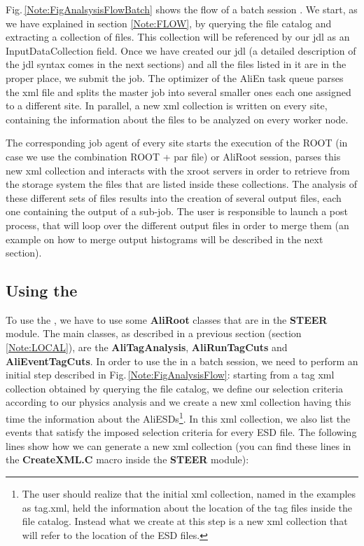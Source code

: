 Fig.\,\ref{Note:FigAnalsysisFlowBatch} shows the flow of a batch session \cite{Note:RefAlienTutorial}. We start, as we have explained in section \ref{Note:FLOW}, by querying the file catalog and extracting a collection of files. This collection will be referenced by our jdl as an {\ttfamily InputDataCollection} field. Once we have created our jdl (a detailed description of the jdl syntax comes in the next sections) and all the files listed in it are in the proper place, we submit the job. The optimizer of the AliEn task queue parses the xml file and splits the master job into several smaller ones each one assigned to a different site. In parallel, a new xml collection is written on every site, containing the information about the files to be analyzed on every worker node.

The corresponding job agent of every site starts the execution of the ROOT (in case we use the combination ROOT + {\ttfamily par file}) or AliRoot session, parses this new xml collection and interacts with the xroot servers in order to retrieve from the storage system the files that are listed inside these collections. The analysis of these different sets of files results into the creation of several output files, each one containing the output of a sub-job. The user is responsible to launch a post process, that will loop over the different output files in order to merge them (an example on how to merge output histograms will be described in the next section).


\subsection{Using the \tag}

To use the \tag, we have to use some {\ttfamily \textbf{AliRoot}} classes that are in the {\ttfamily \textbf{STEER}} module. The main classes, as described in a previous section (section \ref{Note:LOCAL}), are the {\ttfamily \textbf{AliTagAnalysis}}, {\ttfamily \textbf{AliRunTagCuts}} and {\ttfamily \textbf{AliEventTagCuts}}. In order to use the \tag in a batch session, we need to perform an initial step described in Fig.\,\ref{Note:FigAnalysisFlow}: starting from a tag xml collection obtained by querying the file catalog, we define our selection criteria according to our physics analysis and we create a new xml collection having this time the information about the AliESDs\footnote{The user should realize that the initial xml collection, named in the examples as {\ttfamily tag.xml}, held the information about the location of the tag files inside the file catalog. Instead what we create at this step is a new xml collection that will refer to the location of the ESD files.}. In this xml collection, we also list the events that satisfy the imposed selection criteria for every ESD file. The following lines show how we can generate a new xml collection (you can find these lines in the {\ttfamily \textbf{CreateXML.C}} macro inside the {\ttfamily \textbf{STEER}} module):

